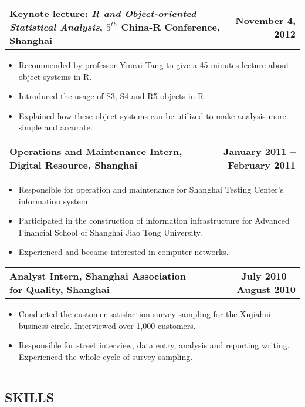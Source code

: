 \documentclass[10pt]{article}
\makeatletter
\newcommand{\headerrow}[2]
{\begin{tabular*}{\linewidth}{l@{\extracolsep{\fill}}r}
	#1 &
	#2 \\
\end{tabular*}}
\makeatother
\begin{document}
\noindent\headerrow
	{\textbf{Keynote lecture: \emph{R and Object-oriented Statistical Analysis}, $5^{th}$ China-R Conference, Shanghai}}
	{\textbf{November 4, 2012}}
\begin{itemize}[topsep=2pt, itemsep=-2pt]
    \setlength{\itemsep}{-2pt}
	\item Recommended by professor Yincai Tang to give a 45 minutes lecture about object systems in R.
	\item Introduced the usage of S3, S4 and R5 objects in R.
	\item Explained how these object systems can be utilized to make analysis more simple and accurate.
\end{itemize}

\noindent\headerrow
	{\textbf{Operations and Maintenance Intern, Digital Resource, Shanghai}}
	{\textbf{January 2011 – February 2011}}
\begin{itemize}[topsep=2pt, itemsep=-2pt]
    \setlength{\itemsep}{-2pt}
	\item Responsible for operation and maintenance for Shanghai Testing Center's information system.
	\item Participated in the construction of information infrastructure for Advanced Financial School of Shanghai Jiao Tong University.
	\item Experienced and became interested in computer networks.
\end{itemize}

\noindent\headerrow
	{\textbf{Analyst Intern, Shanghai Association for Quality, Shanghai}}
	{\textbf{July 2010 – August 2010}}
\begin{itemize}[topsep=2pt, itemsep=-2pt]
	\item Conducted the customer satisfaction survey sampling for the Xujiahui business circle. Interviewed over 1,000 customers.
	\item Responsible for street interview, data entry, analysis and reporting writing. Experienced the whole cycle of survey sampling.
\end{itemize}

\vspace{0.2em}
\hrule
\vspace{-1em}

\subsection*{\centering SKILLS}
\end{document}

